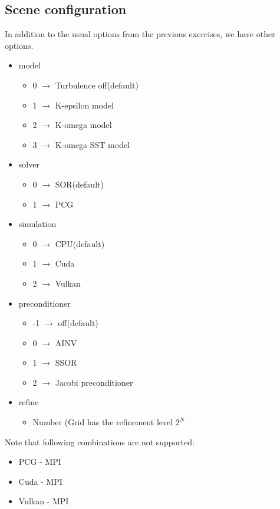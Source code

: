 \documentclass{article}
\begin{document}
\subsection{Scene configuration}
In addition to the usual options from the previous exercises, we have other options.
\begin{itemize}
    \item model
    \begin{itemize}
        \item 0 $\rightarrow$ Turbulence off(default)
        \item 1 $\rightarrow$  K-epsilon model
        \item 2 $\rightarrow$  K-omega model
        \item 3 $\rightarrow$  K-omega SST model
    \end{itemize}
    \item solver
    \begin{itemize}
        \item 0 $\rightarrow$ SOR(default)
        \item 1 $\rightarrow$ PCG
    \end{itemize}
    \item simulation
    \begin{itemize}
        \item 0 $\rightarrow$ CPU(default)
        \item 1 $\rightarrow$ Cuda
        \item 2 $\rightarrow$ Vulkan
    \end{itemize}
    \item preconditioner
    \begin{itemize}
        \item -1 $\rightarrow$ off(default)
        \item 0 $\rightarrow$ AINV
        \item 1 $\rightarrow$ SSOR
        \item 2 $\rightarrow$ Jacobi preconditioner
    \end{itemize}
    \item refine
    \begin{itemize}
        \item Number (Grid has the refinement level $2^N$
    \end{itemize}
\end{itemize}

Note that following combinations are not supported:
\begin{itemize}
    \item PCG - MPI
    \item Cuda - MPI
    \item Vulkan - MPI
\end{itemize}
\end{document}
